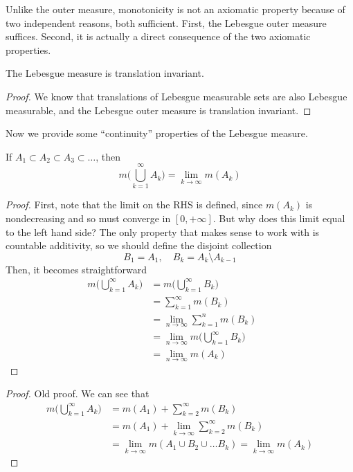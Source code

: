   Unlike the outer measure, monotonicity is not an axiomatic property because of two independent reasons, both sufficient. First, the Lebesgue outer measure suffices. Second, it is actually a direct consequence of the two axiomatic properties.  

  \begin{lemma}
    The Lebesgue measure is translation invariant. 
  \end{lemma}
  \begin{proof}
    We know that translations of Lebesgue measurable sets are also Lebesgue measurable, and the Lebesgue outer measure is translation invariant. 
  \end{proof}

  Now we provide some ``continuity'' properties of the Lebesgue measure. 

  \begin{theorem}
    If $A_1 \subset A_2 \subset A_3 \subset \ldots$, then 
    \begin{equation}
      m \bigg( \bigcup_{k=1}^\infty A_k \bigg) = \lim_{k \rightarrow \infty} m(A_k)
    \end{equation}
  \end{theorem}
  \begin{proof}
    First, note that the limit on the RHS is defined, since $m(A_k)$ is nondecreasing and so must converge in $[0, +\infty]$. But why does this limit equal to the left hand side? The only property that makes sense to work with is countable additivity, so we should define the disjoint collection 
    \begin{equation}
      B_1 = A_1, \quad B_k = A_k \setminus A_{k-1}
    \end{equation}
    Then, it becomes straightforward 
    \begin{align}
      m \bigg( \bigcup_{k=1}^\infty A_k \bigg) 
        & = m \bigg( \bigcup_{k=1}^\infty B_k \bigg) && \tag{Construction} \\ 
        & = \sum_{k=1}^\infty m(B_k) && \tag{Countable Additivity} \\
        & = \lim_{n \to \infty} \sum_{k=1}^n m(B_k) && \tag{Definition of Series} \\
        & = \lim_{n \to \infty} m \bigg( \bigcup_{k=1}^\infty B_k \bigg) && \tag{Finite Additivity} \\
        & = \lim_{n \to \infty} m(A_k)
    \end{align}
  \end{proof}
  \begin{proof}
    Old proof. We can see that 
    \begin{align}
      m\bigg( \bigcup_{k=1}^\infty A_k \bigg) & = m(A_1) + \sum_{k=2}^\infty m(B_k) \\
      & = m(A_1) + \lim_{k \rightarrow \infty} \sum_{k=2}^\infty m(B_k) \\
      & = \lim_{k \rightarrow \infty} m(A_1 \cup B_2 \cup \ldots B_k)  = \lim_{k \rightarrow \infty} m(A_k) 
    \end{align}
  \end{proof}

